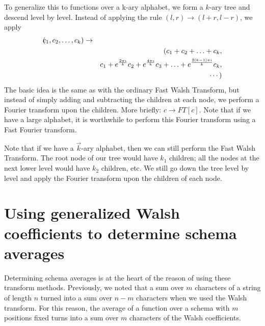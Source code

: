 To generalize this to functions over a k-ary alphabet, we form a $k$-ary
tree and descend level by level.  Instead of applying the rule
$(l,r) \rightarrow (l+r,l-r)$, we apply
\begin{eqnarray}
\lefteqn (c_1,c_2,\ldots,c_k) &\rightarrow& \nonumber \\
& &(c_1+c_2+\ldots+c_k,\nonumber \\
& &c_1+e^{\frac{2 \pi \imath}{k}} c_2 + e^\frac{4 \pi \imath}{k} c_3 + \ldots 
	+ e^\frac{2 (k-1) \pi \imath}{k} c_k, \nonumber \\
& &\cdots)
\end{eqnarray}
The basic idea is the same as with the ordinary Fast Walsh Transform, but
instead of simply adding and subtracting the children at each node, we perform
a Fourier transform upon the children.
More briefly: $c \rightarrow FT[c]$.  Note that if we have a large alphabet,
it is worthwhile to perform this Fourier transform using a Fast Fourier
transform.

Note that if we have a $\vec{k}$-ary alphabet, then we can still perform
the Fast Walsh Transform.  The root node of our tree would have $k_1$
children; all the nodes at the next lower level would have $k_2$ children,
etc.  We still go down the tree level by level and apply the Fourier
transform upon the children of each node.

\section{Using generalized Walsh coefficients to determine schema averages}
Determining schema averages is at the heart of the reason of using these
transform methods.  Previously, we noted that a sum over $m$ characters
of a string of length $n$ turned into a sum over $n-m$ characters when
we used the Walsh transform.  For this reason, the average of a function
over a schema with $m$ positions fixed turns into a sum over $m$ characters
of the Walsh coefficients.

